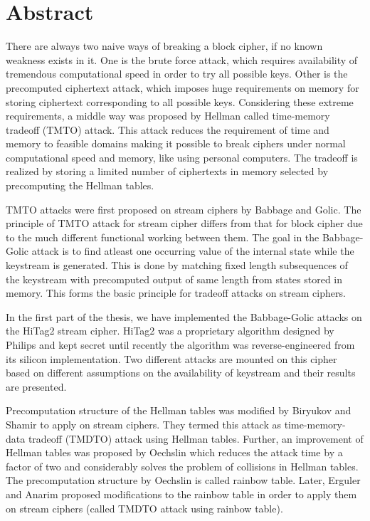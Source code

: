 

\chapter*{Abstract}

There are always two naive ways of breaking a block cipher, if no known weakness exists in it. One is the brute force attack, which requires availability of tremendous computational speed in order to try all possible keys. Other is the precomputed ciphertext attack, which imposes huge requirements on memory for storing ciphertext corresponding to all possible keys. Considering these extreme requirements, a middle way was proposed by Hellman called time-memory tradeoff (TMTO) attack. This attack reduces the requirement of time and memory to feasible domains making it possible to break ciphers under normal computational speed and memory, like using personal computers. The tradeoff is realized by storing a limited number of ciphertexts in memory selected by precomputing the Hellman tables.

TMTO attacks were first proposed on stream ciphers by Babbage and Golic. The principle of TMTO attack for stream cipher differs from that for block cipher due to the much different functional working between them. The goal in the Babbage-Golic attack is to find atleast one occurring value of the internal state while the keystream is generated. This is done by matching fixed length subsequences of the keystream with precomputed output of same length from states stored in memory. This forms the basic principle for tradeoff attacks on stream ciphers. 

In the first part of the thesis, we have implemented the Babbage-Golic attacks on the HiTag2 stream cipher. HiTag2 was a proprietary algorithm designed by Philips and kept secret until recently the algorithm was reverse-engineered from its silicon implementation. Two different attacks are mounted on this cipher based on different assumptions on the availability of keystream and their results are presented. 

Precomputation structure of the Hellman tables was modified by Biryukov and Shamir to apply on stream ciphers. They termed this attack as time-memory-data tradeoff (TMDTO) attack using Hellman tables. Further, an improvement of Hellman tables was proposed by Oechslin which reduces the attack time by a factor of two and considerably solves the problem of collisions in Hellman tables. The precomputation structure by Oechslin is called rainbow table. Later, Erguler and Anarim proposed modifications to the rainbow table in order to apply them on stream ciphers (called TMDTO attack using rainbow table).

